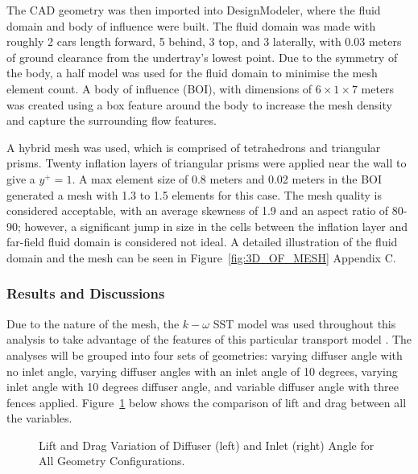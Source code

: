 \noindent The CAD geometry was then imported into DesignModeler, where the fluid domain and body of influence were built. The fluid domain was made with roughly 2 cars length forward, 5 behind, 3 top, and 3 laterally, with 0.03 meters of ground clearance from the undertray's lowest point. Due to the symmetry of the body, a half model was used for the fluid domain to minimise the mesh element count. A body of influence (BOI), with dimensions of  $6 \times 1 \times 7$ meters was created using a box feature around the body to increase the mesh density and capture the surrounding flow features.

\noindent A hybrid mesh was used, which is comprised of tetrahedrons and triangular prisms. Twenty inflation layers of triangular prisms were applied near the wall to give a $y^+=1$. A max element size of 0.8 meters and 0.02 meters in the BOI generated a mesh with 1.3 to 1.5 elements for this case. The mesh quality is considered acceptable, with an average skewness of 1.9 and an aspect ratio of 80-90; however, a significant jump in size in the cells between the inflation layer and far-field fluid domain is considered not ideal. A detailed illustration of the fluid domain and the mesh can be seen in Figure~\ref{fig:3D_OF_MESH} Appendix C.

\subsubsection{Results and Discussions}
Due to the nature of the mesh, the $k-\omega$ SST model was used throughout this analysis to take advantage of the features of this particular transport model \cite{Ansys2006ModelingFlows}. The analyses will be grouped into four sets of geometries: varying diffuser angle with no inlet angle, varying diffuser angles with an inlet angle of 10 degrees, varying inlet angle with 10 degrees diffuser angle, and variable diffuser angle with three fences applied. Figure~\ref{fig:3D_OF_PLOT_COMPARE_ALL} below shows the comparison of lift and drag between all the variables.

\begin{figure}[htb!]
    \centering
    \noindent{}
    \caption{Lift and Drag Variation of Diffuser (left) and Inlet (right) Angle for All Geometry Configurations.}
    \label{fig:3D_OF_PLOT_COMPARE_ALL}
\end{figure}

